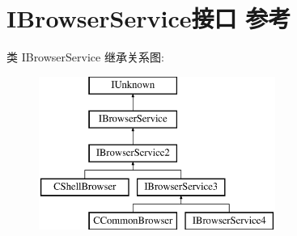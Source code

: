 \hypertarget{interface_i_browser_service}{}\section{I\+Browser\+Service接口 参考}
\label{interface_i_browser_service}
类 I\+Browser\+Service 继承关系图\+:\begin{figure}[H]
\begin{center}
\leavevmode
\includegraphics[height=5.000000cm]{interface_i_browser_service}
\end{center}
\end{figure}
